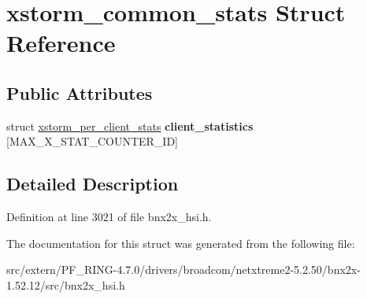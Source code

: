 \hypertarget{structxstorm__common__stats}{
\section{xstorm\_\-common\_\-stats Struct Reference}
\label{structxstorm__common__stats}
}
\subsection*{Public Attributes}
\begin{DoxyCompactItemize}
\item 
\hypertarget{structxstorm__common__stats_a38b875ccbdbcc241387f3f1c7e2e91a7}{
struct \hyperlink{structxstorm__per__client__stats}{xstorm\_\-per\_\-client\_\-stats} {\bfseries client\_\-statistics} \mbox{[}MAX\_\-X\_\-STAT\_\-COUNTER\_\-ID\mbox{]}}
\label{structxstorm__common__stats_a38b875ccbdbcc241387f3f1c7e2e91a7}

\end{DoxyCompactItemize}


\subsection{Detailed Description}


Definition at line 3021 of file bnx2x\_\-hsi.h.



The documentation for this struct was generated from the following file:\begin{DoxyCompactItemize}
\item 
src/extern/PF\_\-RING-\/4.7.0/drivers/broadcom/netxtreme2-\/5.2.50/bnx2x-\/1.52.12/src/bnx2x\_\-hsi.h\end{DoxyCompactItemize}
